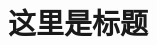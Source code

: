 \documentclass{article}
\date{}
\begin{document}
\title{这里是标题}
\maketitle
\columnseprule=0.2pt
\begin{multicols}{3}
\noindent

\end{multicols}
\end{document}
